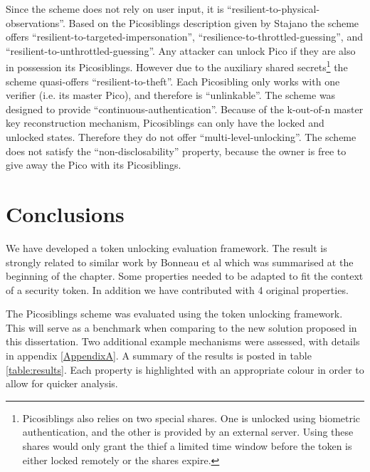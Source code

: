 %
Since the scheme does not rely on user input, it is ``resilient-to-physical-observations''. Based on the Picosiblings description given by Stajano \cite{stajano2011pico} the scheme offers ``resilient-to-targeted-impersonation'', ``resilience-to-throttled-guessing'', and ``resilient-to-unthrottled-guessing''. Any attacker can unlock Pico if they are also in possession its Picosiblings. However due to the auxiliary shared secrets\footnote{Picosiblings also relies on two special shares. One is unlocked using biometric authentication, and the other is provided by an external server. Using these shares would only grant the thief a limited time window before the token is either locked remotely or the shares expire.} the scheme quasi-offers ``resilient-to-theft''. Each Picosibling only works with one verifier (i.e. its master Pico), and therefore is ``unlinkable''. The scheme was designed to provide ``continuous-authentication''. Because of the k-out-of-n master key reconstruction mechanism, Picosiblings can only have the locked and unlocked states. Therefore they do not offer ``multi-level-unlocking''. The scheme does not satisfy the ``non-disclosability'' property, because the owner is free to give away the Pico with its Picosiblings.
	
\section{Conclusions}
We have developed a token unlocking evaluation framework. The result is strongly related to similar work by Bonneau et al \cite{bonneau2012quest} which was summarised at the beginning of the chapter. Some properties needed to be adapted to fit the context of a security token. In addition we have contributed with 4 original properties. 

The Picosiblings scheme was evaluated using the token unlocking framework. This will serve as a benchmark when comparing to the new solution proposed in this dissertation. Two additional example mechanisms were assessed, with details in appendix \ref{AppendixA}. A summary of the results is posted in table \ref{table:results}. Each property is highlighted with an appropriate colour in order to allow for quicker analysis.


